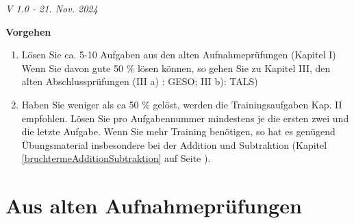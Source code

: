 

\renewcommand{\bbwAufgabenBlockID}{A1Br}

\ifisNURAUFGABEN
\newcommand{\LoesungsBlock}[1]{\TRAINER{Lösung:#1
\vspace{1mm}
\hrule}}%
\else
\newcommand{\LoesungsBlock}[1]{\noTRAINER{\TNTeop{}}\TRAINER{Lösung:#1
\vspace{1mm}
\hrule}}%
\fi

\usepackage{amssymb} %
\renewcommand{\metaHeaderLine}{Arbeitsblatt Bruchrechnen}
\renewcommand{\arbeitsblattTitel}{Zusammenfassung aller Übungen}

\newcommand{\TNTeopS}[1]{\TRAINER{#1}\noTRAINER{\TNTeop{}}}

\arbeitsblattHeader{}

\begin{center}\textit{\tiny{V 1.0 - 21. Nov. 2024}}\end{center}

\tableofcontents{}

\newpage


\textbf{Vorgehen}


\begin{enumerate}
\item 
Lösen Sie ca. 5-10 Aufgaben aus den alten Aufnahmeprüfungen (Kapitel I)
Wenn Sie davon gute 50 \% lösen können, so gehen Sie zu Kapitel III, den
alten Abschlussprüfungen (III a) : GESO; III b): TALS)

\item  Haben Sie weniger als ca 50 \% gelöst, werden die Trainingsaufgaben Kap. II empfohlen.
Lösen Sie pro Aufgabennummer mindestens je die ersten zwei und die letzte Aufgabe.
Wenn Sie mehr Training benötigen, so hat es genügend Übungsmaterial
insbesondere bei der Addition und Subtraktion
(Kapitel \ref{bruchtermeAdditionSubtraktion} auf Seite \pageref{bruchtermeAdditionSubtraktion}).
\end{enumerate}

\newpage

\part{Aus alten Aufnahmeprüfungen}
